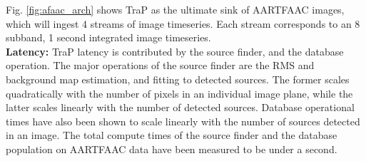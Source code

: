 \documentclass{ws-jai}
\begin{document}
Fig. \ref{fig:afaac_arch}  shows TraP as  the ultimate sink of  AARTFAAC images,
which will ingest 4 streams of image timeseries. Each stream corresponds to an 8
subband, 1 second integrated image timeseries.\\

\noindent \textbf {Latency:}  TraP latency is contributed by  the source finder,
and the  database operation. The major  operations of the source  finder are the
RMS and background  map estimation, and fitting to detected  sources. The former
scales quadratically  with the number  of pixels  in an individual  image plane,
while the latter scales linearly with  the number of detected sources.  Database
operational times  have also  been shown  to scale linearly  with the  number of
sources detected  in an image. The  total compute times of  the source finder and
the  database population  on AARTFAAC  data  have been  measured to  be under  a
second.


\end{document}
